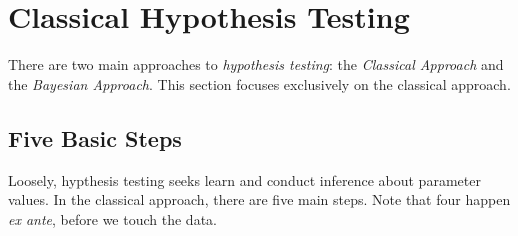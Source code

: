 \documentclass[12pt]{article}
\theoremstyle{plain}
\theoremstyle{definition}
\theoremstyle{remark}
\begin{document}
\clearpage
\section{Classical Hypothesis Testing}

There are two main approaches to \emph{hypothesis testing}: the
\emph{Classical Approach} and the \emph{Bayesian Approach}.  This
section focuses exclusively on the classical approach.

\subsection{Five Basic Steps}

Loosely, hypthesis testing seeks learn and conduct inference about
parameter values.
In the classical approach, there are five main steps. Note that four
happen \emph{ex ante}, before we touch the data.
\end{document}
